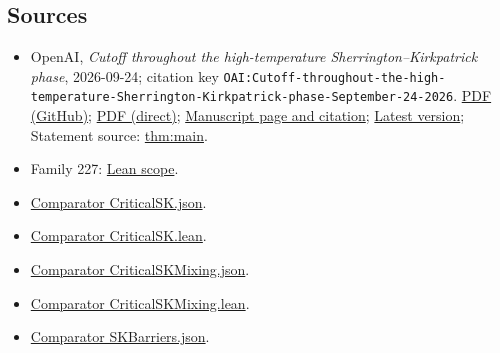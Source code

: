 \documentclass[11pt]{article}
\begin{document}
\subsection{Sources}
\begin{itemize}
\item OpenAI, \emph{Cutoff throughout the high-temperature Sherrington–Kirkpatrick phase}, 2026-09-24; citation key \texttt{OAI:Cutoff-throughout-the-high-temperature-Sherrington-Kirkpatrick-phase-September-24-2026}. \href{https://github.com/openai/math/blob/adc7f1241b42e322a6451854ab7e4b4c146bf78a/preprints/Cutoff-throughout-the-high-temperature-Sherrington-Kirkpatrick-phase-September-24-2026/paper.pdf}{PDF (GitHub)}; \href{https://github.com/openai/math/raw/adc7f1241b42e322a6451854ab7e4b4c146bf78a/preprints/Cutoff-throughout-the-high-temperature-Sherrington-Kirkpatrick-phase-September-24-2026/paper.pdf}{PDF (direct)}; \href{https://github.com/openai/math/blob/adc7f1241b42e322a6451854ab7e4b4c146bf78a/preprints/Cutoff-throughout-the-high-temperature-Sherrington-Kirkpatrick-phase-September-24-2026/README.md}{Manuscript page and citation}; \href{https://github.com/openai/math/blob/main/preprints/Cutoff-throughout-the-high-temperature-Sherrington-Kirkpatrick-phase-September-24-2026/paper.pdf}{Latest version}; Statement source: \href{https://github.com/openai/math/blob/adc7f1241b42e322a6451854ab7e4b4c146bf78a/preprints/Cutoff-throughout-the-high-temperature-Sherrington-Kirkpatrick-phase-September-24-2026/build/sections/01-introduction.tex\#L80}{thm:main}.
\item Family 227: \href{https://github.com/openai/math/blob/adc7f1241b42e322a6451854ab7e4b4c146bf78a/lean/docs/227.md}{Lean scope}.
\item \href{https://github.com/openai/math/blob/adc7f1241b42e322a6451854ab7e4b4c146bf78a/lean/ComparatorChallenges/CriticalSK.json}{Comparator CriticalSK.json}.
\item \href{https://github.com/openai/math/blob/adc7f1241b42e322a6451854ab7e4b4c146bf78a/lean/ComparatorChallenges/CriticalSK.lean}{Comparator CriticalSK.lean}.
\item \href{https://github.com/openai/math/blob/adc7f1241b42e322a6451854ab7e4b4c146bf78a/lean/ComparatorChallenges/CriticalSKMixing.json}{Comparator CriticalSKMixing.json}.
\item \href{https://github.com/openai/math/blob/adc7f1241b42e322a6451854ab7e4b4c146bf78a/lean/ComparatorChallenges/CriticalSKMixing.lean}{Comparator CriticalSKMixing.lean}.
\item \href{https://github.com/openai/math/blob/adc7f1241b42e322a6451854ab7e4b4c146bf78a/lean/ComparatorChallenges/SKBarriers.json}{Comparator SKBarriers.json}.

\end{itemize}
\end{document}
